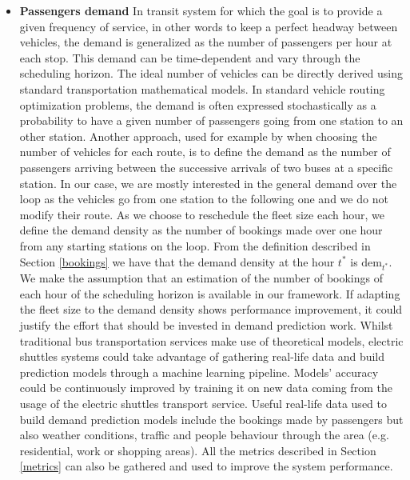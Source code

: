 \documentclass[12pt,a4paper]{article}
\begin{document}
\begin{itemize}
\setlength\itemsep{1pt}
\item \textbf{Passengers demand} In transit system for which the goal is to provide a given frequency of service, in other words to keep a perfect headway between vehicles, the demand is generalized as the number of passengers per hour at each stop. This demand can be time-dependent and vary through the scheduling horizon. The ideal number of vehicles can be directly derived using standard transportation mathematical models. In standard vehicle routing optimization problems, the demand is often expressed stochastically as a probability to have a given number of passengers going from one station to an other station. Another approach, used for example by \cite{ga} when choosing the number of vehicles for each route, is to define the demand as the number of passengers arriving between the successive arrivals of two buses at a specific station. In our case, we are mostly interested in the general demand over the loop as the vehicles go from one station to the following one and we do not modify their route. As we choose to reschedule the fleet size each hour, we define the demand density as the number of bookings made over one hour from any starting stations on the loop. From the definition described in Section \ref{bookings} we have that the demand density at the hour $t^{*}$ is $\text{dem}_{t^{*}}$. We make the assumption that an estimation of the number of bookings of each hour of the scheduling horizon is available in our framework. If adapting the fleet size to the demand density shows performance improvement, it could justify the effort that should be invested in demand prediction work. Whilst traditional bus transportation services make use of theoretical models, electric shuttles systems could take advantage of gathering real-life data and build prediction models through a machine learning pipeline. Models' accuracy could be continuously improved by training it on new data coming from the usage of the electric shuttles transport service. Useful real-life data used to build demand prediction models include the bookings made by passengers but also weather conditions, traffic and people behaviour through the area (e.g. residential, work or shopping areas). All the metrics described in Section \ref{metrics} can also be gathered and used to improve the system performance.

\end{itemize}
\end{document}
